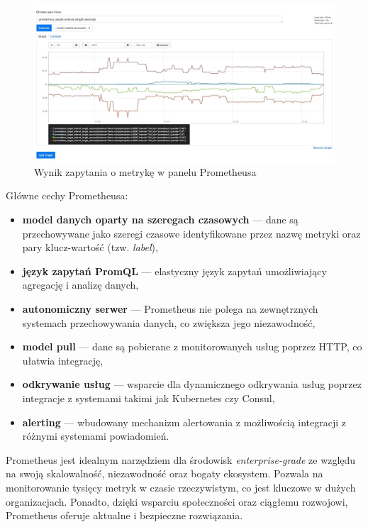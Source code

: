 \documentclass{article}
\begin{document}
\begin{figure}[H]
    \centering
    \includegraphics[width=1\linewidth]{prometheusPrzyklad.png}
    \caption{Wynik zapytania o metrykę w panelu Prometheusa}
    \label{fig:enter-label}
\end{figure}

Główne cechy Prometheusa:

\begin{itemize}
    \item \textbf{model danych oparty na szeregach czasowych} — dane są przechowywane jako szeregi czasowe identyfikowane przez nazwę metryki oraz pary klucz-wartość (tzw. \textit{label}),
    \item \textbf{język zapytań PromQL} — elastyczny język zapytań umożliwiający agregację i analizę danych,
    \item \textbf{autonomiczny serwer} — Prometheus nie polega na zewnętrznych systemach przechowywania danych, co zwiększa jego niezawodność,
    \item \textbf{model pull} — dane są pobierane z monitorowanych usług poprzez HTTP, co ułatwia integrację,
    \item \textbf{odkrywanie usług} — wsparcie dla dynamicznego odkrywania usług poprzez integracje z systemami takimi jak Kubernetes czy Consul,
    \item \textbf{alerting} — wbudowany mechanizm alertowania z możliwością integracji z różnymi systemami powiadomień.
\end{itemize}

Prometheus jest idealnym narzędziem dla środowisk \textit{enterprise-grade} ze względu na swoją skalowalność, niezawodność oraz bogaty ekosystem. Pozwala na monitorowanie tysięcy metryk w czasie rzeczywistym, co jest kluczowe w dużych organizacjach. Ponadto, dzięki wsparciu społeczności oraz ciągłemu rozwojowi, Prometheus oferuje aktualne i bezpieczne rozwiązania.
\end{document}
